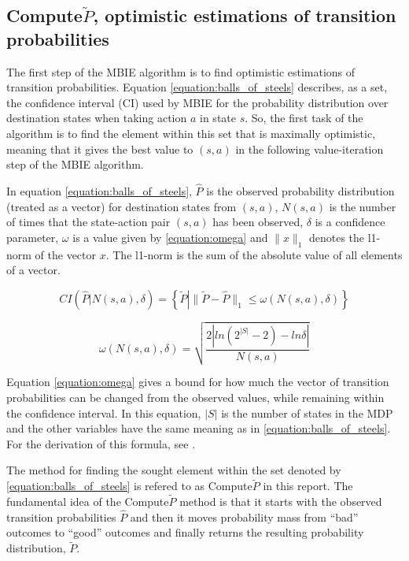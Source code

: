 
\subsection{Compute$\tilde{P}$, optimistic estimations of transition probabilities}
\label{sec:computep}

The first step of the MBIE algorithm is to find optimistic estimations of transition probabilities. Equation \eqref{equation:balls_of_steels} describes, as a set, the confidence interval (CI) used by MBIE for the probability distribution over destination states when taking action $a$ in state $s$. So, the first task of the algorithm is to find the element within this set that is maximally optimistic, meaning that it gives the best value to $(s,a)$ in the following value-iteration step of the MBIE algorithm. 

In equation \eqref{equation:balls_of_steels}, $\hat{P}$ is the observed probability distribution (treated as a vector) for destination states from $(s,a)$, $N(s,a)$ is the number of times that the state-action pair $(s,a)$ has been observed, $\delta$ is a confidence parameter,  $\omega$ is a value given by \eqref{equation:omega} and $\|x\|_1$ denotes the l1-norm of the vector $x$. The l1-norm is the sum of the absolute value of all elements of a vector. 

\begin{equation}
\label{equation:balls_of_steels}
CI\left(\hat{P} \left| N(s, a), \delta\right.\right)  = \left\{\tilde{P} \left| \|\tilde{P} - \hat{P}\|_1 \le \omega(N(s,a), \delta)\right.\right\}
\end{equation}

\begin{equation}
\label{equation:omega}
   \omega(N(s,a),\delta) = {\sqrt{\frac{2|ln(2^{|S|}-2) - ln  \delta |}{N(s,a)}}}
\end{equation}

Equation \eqref{equation:omega} gives a bound for how much the vector of transition probabilities can be changed from the observed values, while remaining within the confidence interval. In this equation, $|S|$ is the number of states in the MDP and the other variables have the same meaning as in \eqref{equation:balls_of_steels}. For the derivation of this formula, see  \textcite{Strehl20081309}.

The method for finding the sought element within the set denoted by \eqref{equation:balls_of_steels} 
is refered to as Compute$\tilde{P}$ in this report. 
The fundamental idea of the Compute$\tilde{P}$ method is that it starts with
the observed transition probabilities $\hat{P}$ and then it moves probability
mass from ``bad'' outcomes to ``good'' outcomes and finally returns the resulting probability distribution, $\tilde{P}$. 

